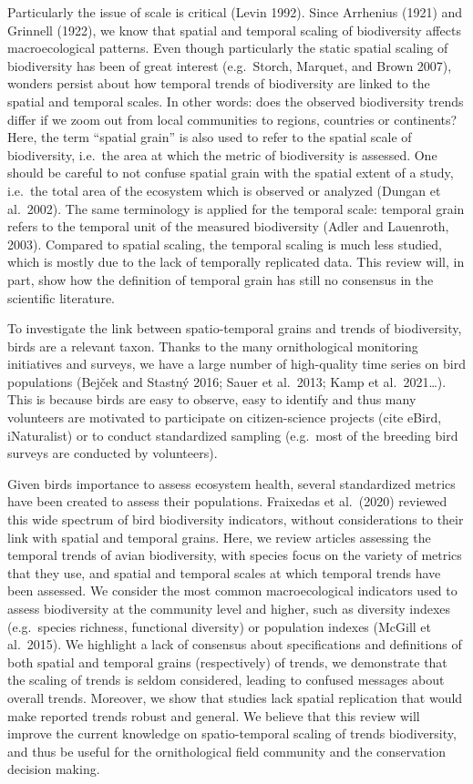 \documentclass[
  12pt,
  oneside]{report}
\begin{document}
Particularly the issue of scale is critical (Levin 1992). Since Arrhenius (1921) and Grinnell (1922), we know that spatial and temporal scaling of biodiversity affects macroecological patterns. Even though particularly the static spatial scaling of biodiversity has been of great interest (e.g.~Storch, Marquet, and Brown 2007), wonders persist about how temporal trends of biodiversity are linked to the spatial and temporal scales. In other words: does the observed biodiversity trends differ if we zoom out from local communities to regions, countries or continents? Here, the term ``spatial grain'' is also used to refer to the spatial scale of biodiversity, i.e.~the area at which the metric of biodiversity is assessed. One should be careful to not confuse spatial grain with the spatial extent of a study, i.e.~the total area of the ecosystem which is observed or analyzed (Dungan et al.~2002). The same terminology is applied for the temporal scale: temporal grain refers to the temporal unit of the measured biodiversity (Adler and Lauenroth, 2003). Compared to spatial scaling, the temporal scaling is much less studied, which is mostly due to the lack of temporally replicated data. This review will, in part, show how the definition of temporal grain has still no consensus in the scientific literature.

To investigate the link between spatio-temporal grains and trends of biodiversity, birds are a relevant taxon. Thanks to the many ornithological monitoring initiatives and surveys, we have a large number of high-quality time series on bird populations (Bejček and Stastný 2016; Sauer et al.~2013; Kamp et al.~2021\ldots). This is because birds are easy to observe, easy to identify and thus many volunteers are motivated to participate on citizen-science projects (cite eBird, iNaturalist) or to conduct standardized sampling (e.g.~most of the breeding bird surveys are conducted by volunteers).

Given birds importance to assess ecosystem health, several standardized metrics have been created to assess their populations. Fraixedas et al.~(2020) reviewed this wide spectrum of bird biodiversity indicators, without considerations to their link with spatial and temporal grains. Here, we review articles assessing the temporal trends of avian biodiversity, with species focus on the variety of metrics that they use, and spatial and temporal scales at which temporal trends have been assessed. We consider the most common macroecological indicators used to assess biodiversity at the community level and higher, such as diversity indexes (e.g.~species richness, functional diversity) or population indexes (McGill et al.~2015). We highlight a lack of consensus about specifications and definitions of both spatial and temporal grains (respectively) of trends, we demonstrate that the scaling of trends is seldom considered, leading to confused messages about overall trends. Moreover, we show that studies lack spatial replication that would make reported trends robust and general. We believe that this review will improve the current knowledge on spatio-temporal scaling of trends biodiversity, and thus be useful for the ornithological field community and the conservation decision making.
\end{document}
